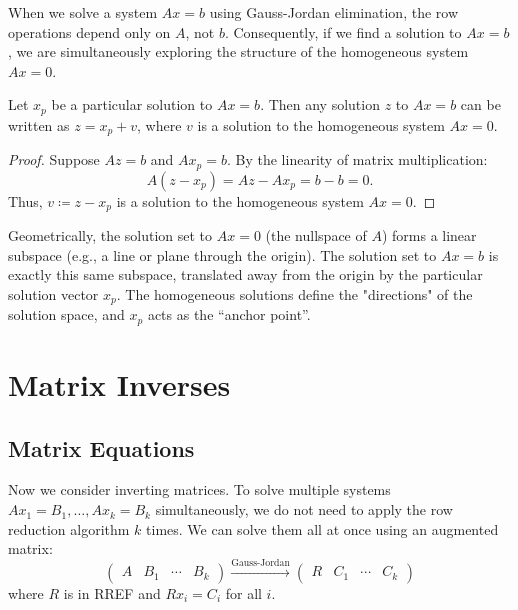 \documentclass[../linear_algebra_and_groups.tex]{subfiles}
\begin{document}
When we solve a system $Ax=b$ using Gauss-Jordan elimination, the row operations depend only on $A$, not $b$. Consequently, if we find a solution to $Ax=b$, we are simultaneously exploring the structure of the homogeneous system $Ax=0$.

\begin{lemma}
    \begin{shaded*}
        Let $x_p$ be a particular solution to $Ax=b$. Then any solution $z$ to $Ax=b$ can be written as $z = x_p + v$, where $v$ is a solution to the homogeneous system $Ax=0$.
    \end{shaded*}
\end{lemma}
\begin{proof}
    Suppose $Az = b$ and $Ax_p = b$. By the linearity of matrix multiplication:
    $$A(z - x_p) = Az - Ax_p = b - b = 0.$$
    Thus, $v \coloneqq z - x_p$ is a solution to the homogeneous system $Ax=0$. 
    \qedhere
\end{proof}

\begin{remark}
    Geometrically, the solution set to $Ax=0$ (the nullspace of $A$) forms a linear subspace (e.g., a line or plane through the origin). The solution set to $Ax=b$ is exactly this same subspace, translated away from the origin by the particular solution vector $x_p$. The homogeneous solutions define the "directions" of the solution space, and $x_p$ acts as the ``anchor point''.
\end{remark}


\section{Matrix Inverses}

\subsection{Matrix Equations}

Now we consider inverting matrices. To solve multiple systems $Ax_1=B_1,\dots,Ax_k=B_k$ simultaneously, we do not need to apply the row reduction algorithm $k$ times. We can solve them all at once using an augmented matrix:
\[ \left(\begin{array}{c|ccc} A & B_1 & \cdots & B_k \end{array}\right) \xrightarrow{\text{Gauss-Jordan}} \left(\begin{array}{c|ccc} R & C_1 & \cdots & C_k \end{array}\right) \]
where $R$ is in RREF and $Rx_i=C_i$ for all $i$.
\end{document}
